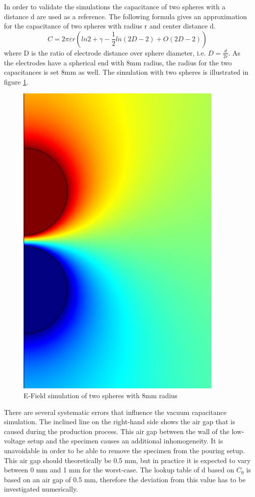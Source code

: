 In order to validate the simulations the capacitance of two spheres with a distance d are used as a reference. The following formula gives an approximation for the capacitance of two spheres with radius r and center distance d. \cite{Rawlins}
\begin{equation}
C=2 \pi \varepsilon r ( ln 2 + \gamma -\frac{1}{2} ln(2D-2)+O(2D-2))
\end{equation}
where D is the ratio of electrode distance over sphere diameter, i.e. $ D=\frac{d}{2r}$. As the electrodes have a spherical end with 8mm radius, the radius for the two capacitances is set 8mm as well. The simulation with two spheres is illustrated in figure \ref{fig.twospheres}.  
\begin{figure}[htbp]
	\centering
	\includegraphics[scale=0.3]{figures/Method/Part1_d_C0/sphere_capacity.jpg}		
	\caption[Kurze Abbildungsbeschreibung]{E-Field simulation of two spheres with 8mm radius } \label{fig.comsol_sphere}
	\label{fig.twospheres}
\end{figure}


 There are several systematic errors that influence the vacuum capacitance simulation. The inclined line on the right-hand side shows the air gap that is caused during the production process. This air gap between the wall of the low-voltage setup and the specimen causes an additional inhomogeneity. It is unavoidable in order to be able to remove the specimen from the pouring setup. This air gap should theoretically be 0.5 mm, but in practice it is expected to vary between 0 mm and 1 mm for the worst-case. The lookup table of d based on $C_0$ is based on an air gap of 0.5 mm, therefore the deviation from this value has to be investigated numerically.
 
